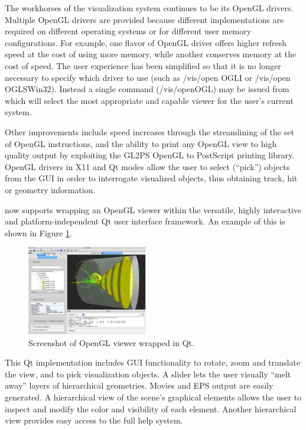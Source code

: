 The workhorses of the \Gfour{} visualization system continues to be its OpenGL
drivers.  Multiple OpenGL drivers are provided because different implementations
are required on different operating systems or for different user memory 
configurations.  For example, one flavor of OpenGL driver offers higher refresh
speed at the cost of using more memory, while another conserves memory at the
cost of speed.  The user experience has been simplified so that it is no longer 
necessary to specify which driver to use (such as /vis/open OGLI or 
/vis/open OGLSWin32).  Instead a single command (/vis/openOGL) may be issued 
from which \Gfour{} will select the most appropriate and capable viewer for the
user's current system.

Other improvements include speed increases through the streamlining of the set
of OpenGL instructions, and the ability to print any OpenGL view to high quality
output by exploiting the GL2PS \cite{vis:GL2PS} OpenGL to PostScript printing 
library.  OpenGL drivers in X11 and Qt modes allow the user to select (``pick'')
objects from the GUI in order to interrogate visualized objects, thus obtaining
track, hit or geometry information.

\Gfour{} now supports wrapping an OpenGL viewer within the versatile, highly
interactive and platform-independent Qt user interface framework.  An example of
this is shown in Figure \ref{fig:vis1}.

\begin{figure}
\includegraphics[width=0.47\textwidth]{figures/visfig1.pdf}
  \caption{Screenshot of OpenGL viewer wrapped in Qt.}
  \label{fig:vis1}
\end{figure}
This Qt implementation includes GUI functionality to rotate, zoom and translate
the view, and to pick visualization objects.  A slider lets the user visually
``melt away'' layers of hierarchical geometries.  Movies and EPS output are 
easily generated.  A hierarchical view of the scene's graphical elements allows 
the user to inspect and modify the color and visibility of each element.  
Another hierarchical view provides easy access to the full \Gfour{} help system.

